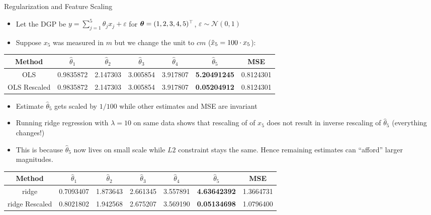 \documentclass[11pt,compress,t,notes=noshow, xcolor=table]{beamer}
\begin{document}
\begin{vbframe}{Regularization and Feature Scaling}
\footnotesize{
\begin{itemize}
    \item Let the DGP be $y = \sum_{j=1}^{5} \theta_j x_{j} +\varepsilon$ for $\bm{\theta}=(1,2,3,4,5)^\top$, $\varepsilon \sim \mathcal{N}(0,1)$ %
    \item Suppose $x_5$ was measured in $m$ but we change the unit to $cm$ ($\Tilde{x}_5=100 \cdot x_5$):
\end{itemize}
\vspace{-0.4cm}
\begin{table}[h]
\centering
\begin{tabular}{|c|c c c c c c|}
\hline
\textbf{Method} & \( \hat{\theta}_1 \) & \( \hat{\theta}_2 \) & \( \hat{\theta}_3 \) & \( \hat{\theta}_4 \) & \( \hat{\theta}_5 \) & MSE \\ \hline
OLS             & 0.9835872 & 2.147303 & 3.005854 & 3.917807 & \textbf{5.20491245} & 0.8124301 \\ %
OLS Rescaled    & 0.9835872 & 2.147303 & 3.005854 & 3.917807 & \textbf{0.05204912} & 0.8124301 \\ \hline
\end{tabular}
\end{table}
\vspace{-0.1cm}
\begin{itemize}
    \item Estimate $\hat{\theta}_5$ gets scaled by $1/100$ while other estimates and MSE are invariant
    \item Running ridge regression with $\lambda=10$ on same data shows that rescaling of of $x_5$ does not result in inverse rescaling of $\hat{\theta}_5$ (everything changes!)
    \item This is because $\hat{\theta}_5$ now lives on small scale while $L2$ constraint stays the same. Hence remaining estimates can ``afford'' larger magnitudes.
\end{itemize}
\vspace{-0.4cm}
\begin{table}[h]
\centering
\begin{tabular}{|c|c c c c c c|}
\hline
\textbf{Method} & \( \hat{\theta}_1 \) & \( \hat{\theta}_2 \) & \( \hat{\theta}_3 \) & \( \hat{\theta}_4 \) & \( \hat{\theta}_5 \) & MSE \\ \hline
ridge           & 0.7093407 & 1.873643 & 2.661345 & 3.557891 & \textbf{4.63642392} & 1.3664731 \\ %
ridge Rescaled  & 0.8021802 & 1.942568 & 2.675207 & 3.569190 & \textbf{0.05134698} & 1.0796400 \\ \hline
\end{tabular}
\end{table}
}


\end{vbframe}
\end{document}

